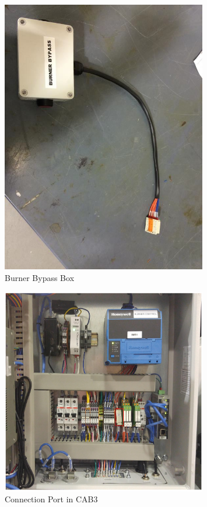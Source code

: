 \begin{figure}[H]
        \centering
        \includegraphics[width=0.8\textwidth]{pictures/burner_box/burner_box.jpg}
        \caption{Burner Bypass Box}   
        \label{fig:bypass_box}
\end{figure}

\begin{figure}[H]
        \centering
        \includegraphics[width=0.8\textwidth]{pictures/burner_box/cab3_connection.jpg}
        \caption{Connection Port in CAB3}
        \label{fig:cab3_conn}
\end{figure}

